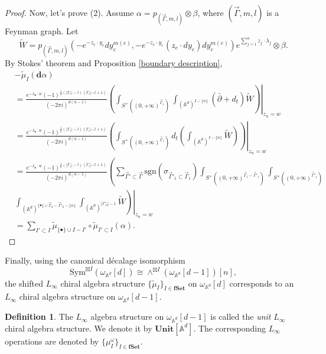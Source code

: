 \documentclass[11pt]{amsart}
\theoremstyle{definition}
\newtheorem{defn}[thm]{Definition}
\theoremstyle{remark}
\numberwithin{equation}{section}
\begin{document}
\begin{proof}
    Now, let's prove (2). Assume $\alpha=p_{(\vec{\Gamma},m,l)}\otimes\beta$, where $(\vec{\Gamma},m,l)$ is a Feynman graph. Let
    $$
    \tilde{W}=p_{(\vec{\Gamma},m,l)}(-e^{-z_{e}\cdot y_{e}}dy_{e}^{m(e)},-e^{-z_{e}\cdot y_{e}}(z_{e}\cdot dy_{e})dy_{e}^{m(e)})e^{\sum_{j=1}^{n}z_{j}\cdot\lambda_{j}}\otimes\beta.
    $$
    By Stokes' theorem and Proposition \ref{boundary description},
    \begin{align*}
        &-\tilde{\mu}_{ I}(\mathbf{d}\alpha)\\
        &=\frac{e^{-\lambda_{\bullet}\cdot w}(-1)^{\frac{1}{2}(|\Gamma_{1}|-l)(\Gamma_{1}|-l+1)}}{(-2\pi i)^{d(n-1)}}\left.\left(\int_{S^{+}((0,+\infty)^{\vec{\Gamma}_{1}})}\int_{(\mathbb{A}^{d})^{ I-\{n\}}}(\bar{\partial}+d_t)\tilde{W}\right)\right|_{z_n=w}\\
        &=
        \frac{e^{-\lambda_{\bullet}\cdot w}(-1)^{\frac{1}{2}(|\Gamma_{1}|-l)(\Gamma_{1}|-l+1)}}{(-2\pi i)^{d(n-1)}}\left.\left(\int_{S^{+}((0,+\infty)^{\vec{\Gamma}_{1}})}d_{t}\left(\int_{(\mathbb{A}^{d})^{ I-\{n\}}}\tilde{W}\right)\right)\right|_{z_n=w}\\
        &=
        \frac{e^{-\lambda_{\bullet}\cdot w}(-1)^{\frac{1}{2}(|\Gamma_{1}|-l)(\Gamma_{1}|-l+1)}}{(-2\pi i)^{d(n-1)}}\left(\sum_{\vec{\Gamma}'\subset \vec{\Gamma}}\mathrm{sgn}(\sigma_{\vec{\Gamma}'_{1}\subset \vec{\Gamma}_{1}})\int_{S^{+}((0,+\infty)^{\vec{\Gamma}_{1}- \vec{\Gamma}'_{1}})}\int_{S^{+}((0,+\infty)^{\vec{\Gamma}'_{1}})}\right.\\
        &
        \left.\left.\int_{(\mathbb{A}^{d})^{\{\bullet\}\cup\vec{\Gamma}_{0}-\vec{\Gamma}'_{0}-\{n\}}}\int_{(\mathbb{A}^{d})^{|\Gamma'_{0}|-1}}\tilde{W}\right)\right|_{z_n=w}\\
        &=
        \sum_{ I'\subset I}\tilde{\mu}_{\{\bullet\}\cup I- I'}\circ \tilde{\mu}_{ I'\subset I}(\alpha).
    \end{align*}
\end{proof}

Finally, using the canonical d\'{e}calage isomorphism
$$
\mathrm{Sym}^{\boxtimes I}(\omega_{\mathbb{A}^{d}}[d])\cong \wedge^{\boxtimes I}(\omega_{\mathbb{A}^{d}}[d-1])[n],
$$
the shifted $L_{\infty}$ chiral algebra structure $\{\tilde{\mu}_{ I}\}_{ I\in \mathbf{fSet}}$ on $\omega_{\mathbb{A}^{d}}[d]$ corresponds to an $L_{\infty}$ chiral algebra structure on $\omega_{\mathbb{A}^{d}}[d-1]$.
\begin{defn}
  The $L_{\infty}$ algebra structure on $\omega_{\mathbb{A}^{d}}[d-1]$ is called the \textit{unit} $L_{\infty}$ chiral
  algebra structure. We denote it by $\mathbf{Unit}[\mathbb{A}^d]$. The corresponding $L_{\infty}$ operations are
  denoted by $\{\mu^{\omega}_{ I}\}_{ I\in \mathbf{fSet}}$.
\end{defn}
\end{document}

